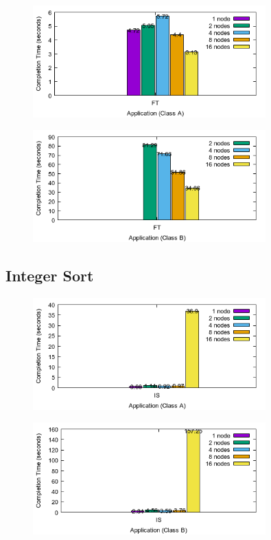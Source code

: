 \documentclass[a4paper]{article}
\begin{document}
\begin{figure}[H]
\centering
\includegraphics[width=0.8\textwidth]{figures/FTvA.png}
\caption{\label{fig:FTvA}}
\end{figure}

\begin{figure}[H]
\centering
\includegraphics[width=0.8\textwidth]{figures/FTvB.png}
\caption{\label{fig:FTvB}}
\end{figure}

\subsection{Integer Sort}

\begin{figure}[H]
\centering
\includegraphics[width=0.8\textwidth]{figures/ISvA.png}
\caption{\label{fig:ISvA}}
\end{figure}

\begin{figure}[H]
\centering
\includegraphics[width=0.8\textwidth]{figures/ISvB.png}
\caption{\label{fig:ISvB}}
\end{figure}
\end{document}
